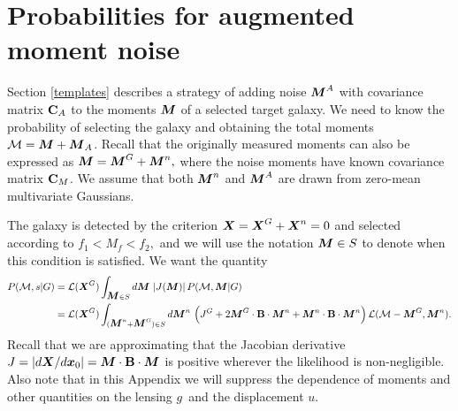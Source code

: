 \documentclass[11pt,preprint,flushrt]{aastex}
\newcommand{\vecX}{\mbox{\boldmath $X$}}
\newcommand{\vecg}{\mbox{\boldmath $g$}}
\newcommand{\vecM}{\mbox{\boldmath $M$}}
\newcommand{\vecx}{\mbox{\boldmath $x$}}
\newcommand{\vecu}{\mbox{\boldmath $u$}}
\newcommand{\matC}{\mbox{$\bf C$}}
\newcommand{\matB}{\mbox{$\bf B$}}
\newcommand{\likeli}{\mbox{$\mathcal{L}$}}
\newcommand\edit[1]{#1}
\begin{document}
\newpage
\appendix
\section{Probabilities for augmented moment noise}
\label{addnoise}
Section \ref{templates} describes a strategy of adding noise $\vecM^A$
with covariance matrix $\matC_A$ to the moments $\vecM$ of a selected
target galaxy.  We need to know the probability of selecting the
galaxy and obtaining the total moments ${\mathcal M}=\vecM +
\vecM_A$.  Recall that the originally measured moments can also be
expressed as $\vecM = \vecM^G + \vecM^n,$ where the noise moments have
known covariance matrix $\matC_M$.  We assume that both $\vecM^n$ and
$\vecM^A$ are drawn from zero-mean multivariate Gaussians.

The galaxy is detected by the criterion $\vecX = \vecX^G + \vecX^n=0$
and selected according to $f_1 < M_f < f_2,$ and we will use the
notation $\vecM \in S$ to denote when this condition is satisfied.
We want the quantity
\begin{align}
P({\mathcal M},s | G) & = \likeli(\vecX^G) \int_{\vecM \in S} d\vecM\, \left|
                        J(\vecM) \right| P({\mathcal M},\vecM |
                        G) \\
 & = \likeli(\vecX^G) \int_{(\vecM^n+\vecM^G) \in S} d\vecM^n\, \left(
   J^G + 2\vecM^G\cdot \matB \cdot \vecM^n + \vecM^n \cdot \matB \cdot
   \vecM^n\right)
   \likeli({\mathcal M}-\vecM^G,\vecM^n).
\label{addnoise1}
\end{align}
Recall that we are approximating that the Jacobian derivative
$J=|d\vecX/d\vecx_0|=\vecM\cdot \matB \cdot \vecM$ is positive wherever
the likelihood is non-negligible.  \edit{Also note that in this
  Appendix we will suppress the dependence of moments and other
  quantities on the lensing \vecg\ and the displacement \vecu.}
\end{document}
